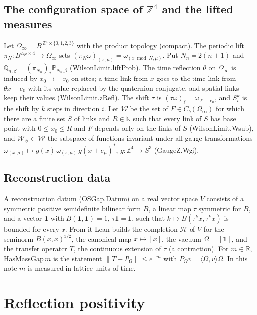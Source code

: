 \documentclass[11pt,a4paper]{article}
\theoremstyle{definition}
\theoremstyle{remark}
\newcommand{\leanus}{\textunderscore\allowbreak{}}
\newcommand{\leandot}{.\allowbreak{}}
\newcommand{\lean}[1]{{\ttfamily\let\_\leanus #1}}
\newcommand{\Z}{\mathbb{Z}}
\newcommand{\R}{\mathbb{R}}
\newcommand{\N}{\mathbb{N}}
\begin{document}
\subsection{The configuration space of \texorpdfstring{$\Z^4$}{Z4} and the lifted measures}

Let $\Omega_\infty=B^{\,\Z^4\times\{0,1,2,3\}}$ with the product topology (compact). The periodic lift $\pi_N:B^{\Lambda_N\times4}\to\Omega_\infty$ sets $(\pi_N\omega)_{(x,\mu)}=\omega_{(x\bmod N,\mu)}$. Put $N_n=2(n+1)$ and $\mathbb Q_{n,\beta}=(\pi_{N_n})_*\mathbb P_{N_n,\beta}$ (\lean{WilsonLimit\leandot{}liftProb}). The time reflection $\theta$ on $\Omega_\infty$ is induced by $x_0\mapsto-x_0$ on sites; a time link from $x$ goes to the time link from $\theta x-e_0$ with its value replaced by the quaternion conjugate, and spatial links keep their values (\lean{WilsonLimit\leandot{}zRefl}). The shift $\tau$ is $(\tau\omega)_\ell=\omega_{\ell+e_0}$, and $S_i^k$ is the shift by $k$ steps in direction $i$. Let
$\mathcal W$ be the set of $F\in C_b(\Omega_\infty)$ for which there are a finite set $S$ of links and $R\in\N$ such that every link of $S$ has base point with $0\le x_0\le R$ and $F$ depends only on the links of $S$
(\lean{WilsonLimit\leandot{}Wsub}), and $\mathcal W_{\mathrm{gi}}\subset\mathcal W$ the subspace of functions invariant under all gauge transformations $\omega_{(x,\mu)}\mapsto g(x)\,\omega_{(x,\mu)}\,g(x+e_\mu)^*$, $g:\Z^4\to S^3$ (\lean{GaugeZ\leandot{}Wgi}).

\subsection{Reconstruction data}

A reconstruction datum (\lean{OSGap\leandot{}Datum}) on a real vector space $V$ consists of a symmetric positive semidefinite bilinear form $B$, a linear map $\tau$ symmetric for $B$, and a vector $\mathbf 1$ with $B(\mathbf 1,\mathbf 1)=1$, $\tau\mathbf 1=\mathbf 1$, such that $k\mapsto B(\tau^kx,\tau^kx)$ is bounded for every $x$. From it Lean builds the completion $\mathcal H$ of $V$ for the seminorm $B(x,x)^{1/2}$, the canonical map $x\mapsto[x]$, the vacuum $\Omega=[\mathbf 1]$, and the transfer operator $T$, the continuous extension of $\tau$ (a contraction). For $m\in\R$, \lean{HasMassGap}$\,m$ is the statement $\|T-P_\Omega\|\le e^{-m}$ with $P_\Omega v=\langle\Omega,v\rangle\Omega$. In this note $m$ is measured in lattice units of time.

\section{Reflection positivity}\label{sec:rp}
\end{document}
